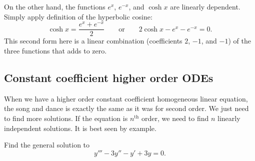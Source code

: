 \documentclass{ximera}
\begin{document}
\begin{example}
    On the other hand, the functions $e^x$, $e^{-x}$, and $\cosh x$ are linearly dependent.  Simply apply definition of the hyperbolic cosine:
    \begin{equation*}
        \cosh x = \frac{e^x + e^{-x}}{2} \qquad \text{or} \qquad 2 \cosh x - e^x - e^{-x} = 0.
    \end{equation*}
    This second form here is a linear combination (coefficients $2$, $-1$, and $-1$) of the three functions that adds to zero.
\end{example}

\subsection{Constant coefficient higher order ODEs}

When we have a higher order constant coefficient homogeneous linear equation, the song and dance is exactly the same as it was for second order. We just need to find more solutions.  If the equation is $n^{\text{th}}$ order, we need to find $n$ linearly independent solutions. It is best seen by example.

\begin{example}
    Find the general solution to
    \begin{equation} \label{hol:cceq1}
        y''' - 3 y'' - y' + 3y = 0 .
    \end{equation}
\end{example}
\end{document}
